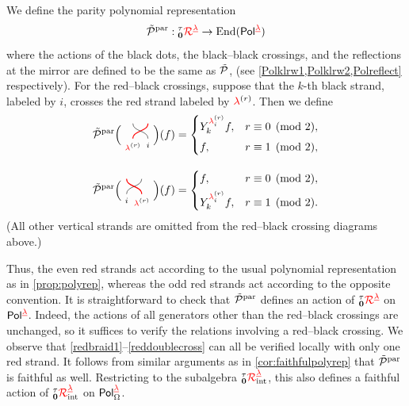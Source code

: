 \begin{definition}
    We define the parity polynomial representation
    \begin{equation}
        \label{eq:paritypol}
        \tilde{\mathcal{P}}^{\mathrm{par}}: {}^\tau_{{\mathbf{0}}}{{{\color{red}\mathcal{R}}}}^{{{\color{red}\underline{\lambda}}}} \to \operatorname{End}(\mathsf{Pol}^{{\color{red}\underline{\lambda}}})
    \end{equation}
    where the actions of the black dots, the black--black
crossings, and the reflections at the mirror are defined to be the same as $\tilde{\mathcal{P}}$,
(see \cref{Polklrw1,Polklrw2,Polreflect} respectively). For the red--black crossings, suppose that the
\(k\)-th black strand, labeled by \(i\), crosses the red strand labeled
by \({\color{red}\lambda}^{(r)}\). Then we define
\begin{equation}
    \label{paritycross}
\begin{aligned}
\ctP^{\mathrm{par}}
\Big(
\begin{tikzpicture}[baseline=.6,scale=1.2]
    \draw (0,0)[red,thick]
        \botlabel{\rlam^{\textcolor{black}{(r)}}}
        \braidup (.4,.4);
    \draw (.4,0)
        \botlabel{i}
        \braidup (0,.4);
\end{tikzpicture}
\Big)(f)
&=
\begin{cases}
Y_k^{\rlam^{(r)}_i}f,
&
r\equiv0\pmod 2,
\\[0.4em]
f,
&
r\equiv1\pmod 2,
\end{cases}
\\[1em]
\ctP^{\mathrm{par}}
\Big(
\begin{tikzpicture}[baseline=.6,scale=1.2]
    \draw (0,0)
        \botlabel{i}
        \braidup (.4,.4);
    \draw (.4,0)[red,thick]
        \botlabel{\rlam^{\textcolor{black}{(r)}}}
        \braidup (0,.4);
\end{tikzpicture}
\Big)(f)
&=
\begin{cases}
f,
&
r\equiv0\pmod 2,
\\[0.4em]
Y_k^{\rlam^{(r)}_i}f,
&
r\equiv1\pmod 2.
\end{cases}
\end{aligned}
\end{equation}
(All other vertical strands are omitted from the red--black crossing diagrams above.)
\end{definition}

Thus, the even red strands act according to the usual polynomial
representation as in \cref{prop:polyrep}, whereas the odd red strands act according to the
opposite convention. It is straightforward to check that $\tilde{\mathcal{P}}^{\mathrm{par}}$ defines an action of ${}^\tau_{{\mathbf{0}}}{{{\color{red}\mathcal{R}}}}^{{\color{red}\underline{\lambda}}}$ on $\mathsf{Pol}^{{\color{red}\underline{\lambda}}}$. Indeed, the actions of all generators other than the red--black crossings are unchanged, so it suffices to verify the relations involving a red--black crossing. We observe that \cref{redbraid1}--\cref{reddoublecross} can all be verified locally with only one red strand.  It follows from similar arguments as in \cref{cor:faithfulpolyrep} that $\tilde{\mathcal{P}}^{\mathrm{par}}$ is faithful as well. Restricting to the subalgebra ${{}^\tau_{\mathbf{0}}{\color{red}\mathcal{R}}^{{{\color{red}\underline{\lambda}}}}_{\text{int}}}$, this also defines a faithful action of ${{}^\tau_{\mathbf{0}}{\color{red}\mathcal{R}}^{{{\color{red}\underline{\lambda}}}}_{\text{int}}}$ on ${\mathsf{Pol}^{{{\color{red}\underline{\lambda}}}}_{\Omega}}$.

